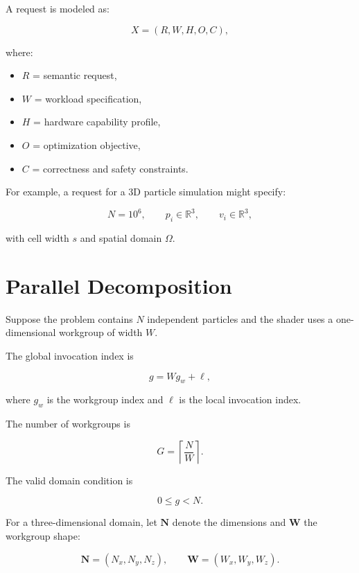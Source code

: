 \documentclass[11pt,a4paper,oneside]{report}
\begin{document}
A request is modeled as:

\begin{equation}
X = (R,W,H,O,C),
\end{equation}

where:

\begin{itemize}
  \item $R$ = semantic request,
  \item $W$ = workload specification,
  \item $H$ = hardware capability profile,
  \item $O$ = optimization objective,
  \item $C$ = correctness and safety constraints.
\end{itemize}

For example, a request for a 3D particle simulation might specify:

\[
N=10^6,\qquad
p_i\in\mathbb{R}^3,\qquad
v_i\in\mathbb{R}^3,
\]

with cell width $s$ and spatial domain $\Omega$.

\section{Parallel Decomposition}

Suppose the problem contains $N$ independent particles and the shader uses a one-dimensional
workgroup of width $W$.

The global invocation index is

\begin{equation}
g = Wg_w+\ell,
\end{equation}

where $g_w$ is the workgroup index and $\ell$ is the local invocation index.

The number of workgroups is

\begin{equation}
G=\left\lceil\frac{N}{W}\right\rceil.
\end{equation}

The valid domain condition is

\begin{equation}
0\le g<N.
\end{equation}

For a three-dimensional domain, let $\mathbf{N}$ denote the dimensions and $\mathbf{W}$ the
workgroup shape:

\[
\mathbf{N}=(N_x,N_y,N_z),
\qquad
\mathbf{W}=(W_x,W_y,W_z).
\]
\end{document}
